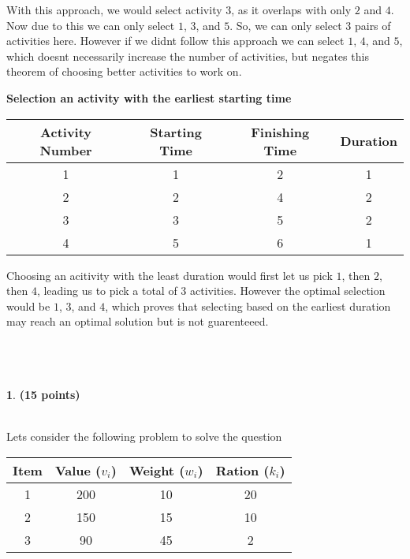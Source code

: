 \documentclass[11pt]{article}
\theoremstyle{definition}
\newtheorem{prob}{}
\newcommand{\solution}{\medskip\noindent{\color{DarkBlue}\textbf{Solution:}}}
\begin{document}
With this approach, we would select activity $3$, as it overlaps with only $2$ and $4$. Now due to this we can only select
$1$, $3$, and $5$. So, we can only select 3 pairs of activities here. However if we didnt follow this approach we can select
$1$, $4$, and $5$, which doesnt necessarily increase the number of activities, but negates this theorem of choosing better
activities to work on.

\textbf{Selection an activity with the earliest starting time} \\

\begin{tabular}{|c|c|c|c|}
    \hline
    Activity Number & Starting Time & Finishing Time & Duration \\
    \hline
    1 & 1 & 2 & 1 \\
    2 & 2 & 4 & 2 \\
    3 & 3 & 5 & 2 \\
    4 & 5 & 6 & 1 \\
    
    \hline
\end{tabular}

Choosing an acitivity with the least duration would first let us pick $1$, then $2$, then $4$, leading us to pick a
total of 3 activities. However the optimal selection would be $1$, $3$, and $4$, which proves that selecting based on the 
earliest duration may reach an optimal solution but is not guarenteeed. \\ \\ \\ \\

\begin{prob} \textbf{(15 points)}
\end{prob}

\solution \\

Lets consider the following problem to solve the question

\begin{tabular}{|c|c|c|c|}
    \hline
    Item & Value ($v_i$) & Weight ($w_i$) & Ration ($k_i$) \\
    \hline
    1 & 200 & 10 & 20 \\
    2 & 150 & 15 & 10 \\
    3 & 90 & 45 & 2 \\
    
    \hline
\end{tabular}
\\
\end{document}
